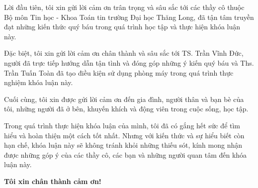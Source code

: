 
\begin{acknowledgements}
	\setlength{\parindent}{5ex}
	Lời đầu tiên, tôi xin gửi lời cảm ơn trân trọng và sâu sắc tới các thầy cô thuộc Bộ môn Tin học - Khoa Toán tin trường Đại học Thăng Long, đã tận tâm truyền đạt những kiến thức quý báu trong quá trình học tập và thực hiện khóa luận này. \par
	
	Đặc biệt, tôi xin gửi lời cảm ơn chân thành và sâu sắc tới TS. Trần Vĩnh Đức, người đã trực tiếp hướng dẫn tận tình và đóng góp những ý kiến quý báu và Ths. Trần Tuấn Toàn đã tạo điều kiện sử dụng phòng máy trong quá trình thực nghiệm khóa luận này. \par
	
	Cuối cùng, tôi xin được gửi lời cảm ơn đến gia đình, người thân và bạn bè của tôi, những người đã ở bên, khuyến khích và động viên trong cuộc sống, học tập.\par
	
	Trong quá trình thực hiện khóa luận của mình, tôi đã có gắng hết sức để tìm hiểu và hoàn thiện một cách tốt nhất. Nhưng với kiến thức và sự hiểu biết còn hạn chế, khóa luận này sẽ không tránh khỏi những thiếu sót, kính mong nhận được những góp ý của các thầy cô, các bạn và những người quan tâm đến khóa luận này.\par
	
\textbf{Tôi xin chân thành cảm ơn!}
	
\begin{multicols}{2}
	\qquad\qquad\quad 
	\columnbreak \\
	\par \medskip
	\par \medskip
	\par \medskip
	\par \medskip
	\par \medskip
	\par \medskip
	\par \medskip
	\par \medskip
	\par 
\end{multicols}
\end{acknowledgements}
  